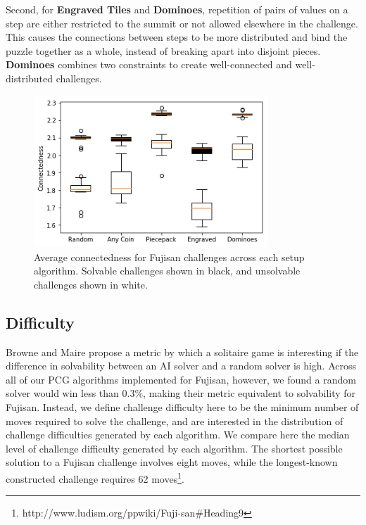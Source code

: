 \documentclass[journal]{IEEEtran}
\begin{document}
Second, for {\bf Engraved Tiles} and {\bf Dominoes}, repetition of pairs of values on a step are either restricted to the summit or not allowed elsewhere in the challenge. This causes the connections between steps to be more distributed and bind the puzzle together as a whole, instead of breaking apart into disjoint pieces. {\bf Dominoes} combines two constraints to create well-connected and well-distributed challenges.

\begin{figure}[t]
\includegraphics[width=8.8cm]{connectedness.png}
\caption{Average connectedness for Fujisan challenges across each setup algorithm. 
Solvable challenges shown in black, and unsolvable challenges shown in white.}
\label{fig:connected}
\end{figure}


\subsection{Difficulty}

Browne and Maire \cite{MCPUZZLE} propose a metric by which a solitaire game is interesting if the difference in solvability between an AI solver and a random solver is high. Across all of our PCG algorithms implemented for Fujisan, however, we found a random solver would win less than 0.3\%, making their metric equivalent to solvability for Fujisan. Instead, we define challenge difficulty here to be the minimum number of moves required to solve the challenge, and are interested in the distribution of challenge difficulties generated by each algorithm. We compare here the median level of challenge difficulty generated by each algorithm. The shortest possible solution to a Fujisan challenge involves eight moves, while 
the longest-known constructed challenge requires 62 moves\footnote{http://www.ludism.org/ppwiki/Fuji-san\#Heading9}.
\end{document}
